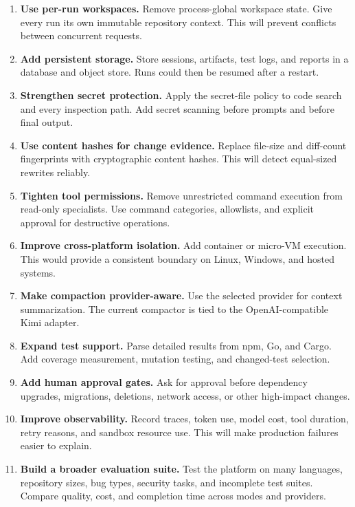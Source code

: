 \documentclass[11pt,a4paper]{article}
\begin{document}
\begin{enumerate}
  \item \textbf{Use per-run workspaces.}
  Remove process-global workspace state. Give every run its own immutable
  repository context. This will prevent conflicts between concurrent requests.

  \item \textbf{Add persistent storage.}
  Store sessions, artifacts, test logs, and reports in a database and object
  store. Runs could then be resumed after a restart.

  \item \textbf{Strengthen secret protection.}
  Apply the secret-file policy to code search and every inspection path. Add
  secret scanning before prompts and before final output.

  \item \textbf{Use content hashes for change evidence.}
  Replace file-size and diff-count fingerprints with cryptographic content
  hashes. This will detect equal-sized rewrites reliably.

  \item \textbf{Tighten tool permissions.}
  Remove unrestricted command execution from read-only specialists. Use command
  categories, allowlists, and explicit approval for destructive operations.

  \item \textbf{Improve cross-platform isolation.}
  Add container or micro-VM execution. This would provide a consistent boundary
  on Linux, Windows, and hosted systems.

  \item \textbf{Make compaction provider-aware.}
  Use the selected provider for context summarization. The current compactor is
  tied to the OpenAI-compatible Kimi adapter.

  \item \textbf{Expand test support.}
  Parse detailed results from npm, Go, and Cargo. Add coverage measurement,
  mutation testing, and changed-test selection.

  \item \textbf{Add human approval gates.}
  Ask for approval before dependency upgrades, migrations, deletions, network
  access, or other high-impact changes.

  \item \textbf{Improve observability.}
  Record traces, token use, model cost, tool duration, retry reasons, and
  sandbox resource use. This will make production failures easier to explain.

  \item \textbf{Build a broader evaluation suite.}
  Test the platform on many languages, repository sizes, bug types, security
  tasks, and incomplete test suites. Compare quality, cost, and completion time
  across modes and providers.
\end{enumerate}
\end{document}
